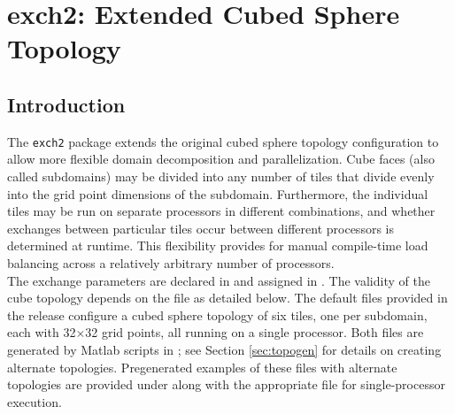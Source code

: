 


\section{exch2: Extended Cubed Sphere \mbox{Topology}}
\label{sec:exch2}


\subsection{Introduction}

The \texttt{exch2} package extends the original cubed
sphere topology configuration to allow more flexible domain
decomposition and parallelization.  Cube faces (also called
subdomains) may be divided into any number of tiles that divide evenly
into the grid point dimensions of the subdomain.  Furthermore, the
individual tiles may be run on separate processors in different
combinations, and whether exchanges between particular tiles occur
between different processors is determined at runtime.  This
flexibility provides for manual compile-time load balancing across a
relatively arbitrary number of processors. \\

The exchange parameters are declared in
and assigned in
. The
validity of the cube topology depends on the  file as
detailed below.  The default files provided in the release configure a
cubed sphere topology of six tiles, one per subdomain, each with
32$\times$32 grid points, all running on a single processor.  Both
files are generated by Matlab scripts in
; see Section
\ref{sec:topogen} 
for details on creating alternate topologies.  Pregenerated examples
of these files with alternate topologies are provided under
 along with the appropriate 
file for single-processor execution.

